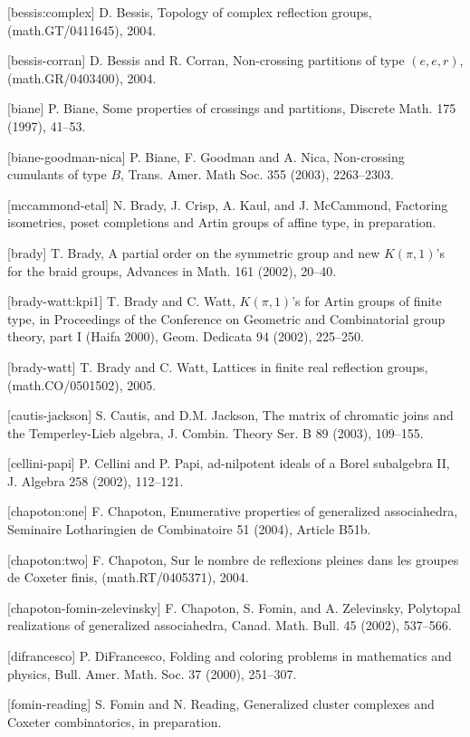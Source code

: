 \documentclass[12pt,letterpaper, reqno]{amsart}
\begin{document}
[bessis:complex]
D. Bessis, Topology of complex reflection groups, (math.GT/0411645), 2004.

[bessis-corran]
D. Bessis and R. Corran, Non-crossing partitions of type $(e,e,r)$, (math.GR/0403400), 2004.

[biane]
P. Biane, Some properties of crossings and partitions, Discrete Math. {175} (1997), 41--53.

[biane-goodman-nica]
P. Biane, F. Goodman and A. Nica, Non-crossing cumulants of type $B$, Trans. Amer. Math Soc. {355} (2003), 2263--2303.

[mccammond-etal]
N. Brady, J. Crisp, A. Kaul, and J. McCammond, Factoring isometries, poset completions and Artin groups of affine type, in preparation.

[brady]
T. Brady, A partial order on the symmetric group and new $K(\pi,1)$'s for the braid groups, Advances in Math. {161} (2002), 20--40.

[brady-watt:kpi1]
T. Brady and C. Watt, $K(\pi,1)$'s for Artin groups of finite type, in Proceedings of the Conference on Geometric and Combinatorial group theory, part I (Haifa 2000), Geom. Dedicata {94} (2002), 225--250.

[brady-watt]
T. Brady and C. Watt, Lattices in finite real reflection groups, (math.CO/0501502), 2005.

[cautis-jackson]
S. Cautis, and D.M. Jackson, The matrix of chromatic joins and the Temperley-Lieb algebra, J. Combin. Theory Ser. B {89} (2003), 109--155.

[cellini-papi]
P. Cellini and P. Papi, ad-nilpotent ideals of a Borel subalgebra II, J. Algebra {258} (2002), 112--121.

[chapoton:one]
F. Chapoton, Enumerative properties of generalized associahedra, Seminaire Lotharingien de Combinatoire {51} (2004), Article B51b.

[chapoton:two]
F. Chapoton, Sur le nombre de reflexions pleines dans les groupes de Coxeter finis, (math.RT/0405371), 2004.

[chapoton-fomin-zelevinsky]
F. Chapoton, S. Fomin, and A. Zelevinsky, Polytopal realizations of generalized associahedra, Canad. Math. Bull. {45} (2002), 537--566.

[difrancesco]
P.  DiFrancesco, Folding and coloring problems in mathematics and physics, Bull.  Amer. Math. Soc. {37} (2000), 251--307.

[fomin-reading]
S. Fomin and N. Reading, Generalized cluster complexes and Coxeter combinatorics, in preparation.
\end{document}
